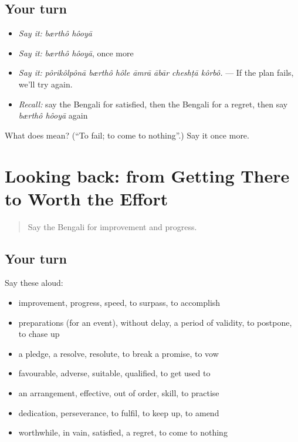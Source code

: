 \subsection*{Your turn}
\begin{itemize}
\raggedright
  \item \emph{Say it:} \emph{bærthô hôoyā}
  \item \emph{Say it:} \emph{bærthô hôoyā}, once more
  \item \emph{Say it:} \emph{pôrikôlpônā bærthô hôle āmrā ābār cheshṭā kôrbô.} — If the plan fails, we'll try again.
  \item \emph{Recall:} say the Bengali for satisfied, then the Bengali for a regret, then say \emph{bærthô hôoyā} again
\end{itemize}

\begin{tcolorbox}[breakable,colback=teal!4,colframe=teal!35!black,title={Before you move on}]
What does   mean? (\textquotedblleft{}To fail; to come to nothing\textquotedblright{}.) Say it once more.
\end{tcolorbox}
\section[(dialogue)]{Looking back: from Getting There to Worth the Effort}

\label{lesson:BN-R383-review-377-383}



\begin{quote}
Say the Bengali for improvement and progress.
\end{quote}

\subsection*{Your turn}
Say these aloud:

\begin{itemize}
\raggedright
  \item improvement, progress, speed, to surpass, to accomplish
  \item preparations (for an event), without delay, a period of validity, to postpone, to chase up
  \item a pledge, a resolve, resolute, to break a promise, to vow
  \item favourable, adverse, suitable, qualified, to get used to
  \item an arrangement, effective, out of order, skill, to practise
  \item dedication, perseverance, to fulfil, to keep up, to amend
  \item worthwhile, in vain, satisfied, a regret, to come to nothing
\end{itemize}

